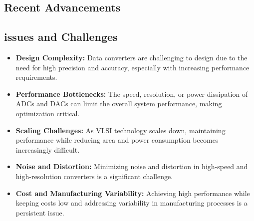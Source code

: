 \subsection{Recent Advancements}


\subsection{issues and Challenges}
\begin{itemize}
    \item \textbf{Design Complexity:} Data converters are challenging to design due to the need for high precision and accuracy, especially with increasing performance requirements.
    \item \textbf{Performance Bottlenecks:} The speed, resolution, or power dissipation of ADCs and DACs can limit the overall system performance, making optimization critical.
    \item \textbf{Scaling Challenges:} As VLSI technology scales down, maintaining performance while reducing area and power consumption becomes increasingly difficult.
    \item \textbf{Noise and Distortion:} Minimizing noise and distortion in high-speed and high-resolution converters is a significant challenge.
    \item \textbf{Cost and Manufacturing Variability:} Achieving high performance while keeping costs low and addressing variability in manufacturing processes is a persistent issue.
\end{itemize}
